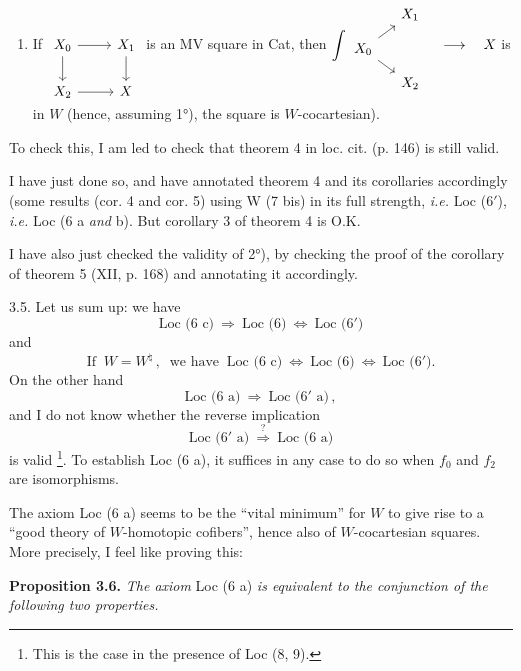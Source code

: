 \begin{enumerate}
\item[1° bis)] If
$\begin{tikzcd}[ampersand replacement=\&, baseline=(\tikzcdmatrixname-1-1.base)]
X_0 \arrow[r] \arrow[d] \& X_1 \arrow[d] \\
X_2 \arrow[r] \& X
\end{tikzcd}$
is an MV square in Cat, then
$\displaystyle\int
\begin{tikzcd}[ampersand replacement=\&, row sep=small, column sep=small]
\& X_1 \\
X_0 \arrow[ur] \arrow[dr] \& \\
\& X_2
\end{tikzcd}
\quad \longrightarrow \quad X$ is in $W$ (hence, assuming 1°), the square is $W$-cocartesian).
\end{enumerate}

To check this, I am led to check that theorem 4 in loc. cit. (p. 146) is still valid.

I have just done so, and have annotated theorem 4 and its corollaries accordingly (some results (cor. 4 and cor. 5) using W (7 bis) in its full strength, \textit{i.e.} Loc (6$'$), \textit{i.e.} Loc (6 a \textit{and} b). But corollary 3 of theorem 4 is O.K.

I have also just checked the validity of 2°), by checking the proof of the corollary of theorem 5 (XII, p. 168) and annotating it accordingly.

3.5. Let us sum up: we have
\[
\text{Loc (6 c)} \ \Longrightarrow \ \text{Loc (6)} \ \iff \ \text{Loc (6$'$)}
\tag*{(3.5.1)}
\]
and
\[
\text{If } \ W = W^{\natural}\,, \ \text{ we have } \ \text{Loc (6 c)} \ \iff \ \text{Loc (6)} \ \iff \ \text{Loc (6$'$)}.
\tag*{(3.5.2)}
\]
On the other hand
\[
\text{Loc (6 a)} \ \Longrightarrow \ \text{Loc (6$'$ a)}\,,
\tag*{(3.5.3)}
\]
and I do not know whether the reverse implication
\[
\text{Loc (6$'$ a)} \ \overset{?}{\Longrightarrow} \ \text{Loc (6 a)}
\]
is valid \footnote[18]{This is the case in the presence of Loc (8, 9).}. To establish Loc (6 a), it suffices in any case to do so when $f_0$ and $f_2$ are isomorphisms.

The axiom Loc (6 a) seems to be the ``vital minimum'' for $W$ to give rise to a ``good theory of $W$-homotopic cofibers'', hence also of $W$-cocartesian squares. More precisely, I feel like proving this:

\textbf{Proposition 3.6.} \textit{The axiom} Loc (6 a) \textit{is equivalent to the conjunction of the following two properties.}

